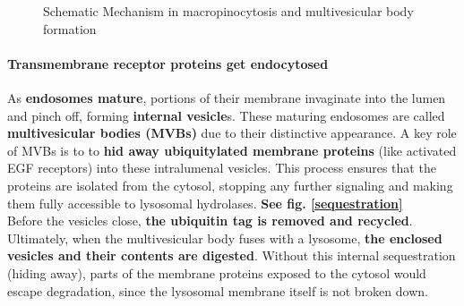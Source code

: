 \documentclass[../main.tex]{subfiles}
\begin{document}
\begin{figure}[H]
	\centering
	\caption{Schematic Mechanism in macropinocytosis and multivesicular body formation}
\end{figure}

\paragraph{Transmembrane receptor proteins get endocytosed}

As \textbf{endosomes mature}, portions of their membrane invaginate into the lumen and pinch off, forming \textbf{internal vesicle}s. These maturing endosomes are called \textbf{multivesicular bodies (MVBs)} due to their distinctive appearance. A key role of MVBs is to to \textbf{hid away ubiquitylated membrane proteins} (like activated EGF receptors) into these intralumenal vesicles. This process ensures that the proteins are isolated from the cytosol, stopping any further signaling and making them fully accessible to lysosomal hydrolases. \textbf{See fig. \ref{sequestration}} \\
\indent Before the vesicles close, \textbf{the ubiquitin tag is removed and recycled}. Ultimately, when the multivesicular body fuses with a lysosome, \textbf{the enclosed vesicles and their contents are digested}. Without this internal sequestration (hiding away), parts of the membrane proteins exposed to the cytosol would escape degradation, since the lysosomal membrane itself is not broken down.
\end{document}
